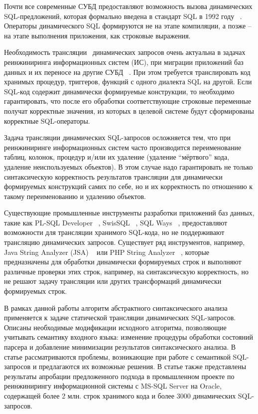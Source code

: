 \documentclass[a5paper]{article}
\begin{document}
Почти все современные СУБД предоставляют возможность вызова динамических SQL-предложений, которая формально введена в стандарт SQL в 1992 году ~\cite{ISO}. Операторы динамического SQL формируются не на этапе компиляции, а позже -- на этапе выполнения приложения, как строковые выражения.

Необходимость трансляции~\cite{mart} динамических запросов очень актуальна в задачах реинжиниринга информационных систем (ИС), при миграции приложений баз данных и их переносе на другие СУБД ~\cite{NetDbTransform}. При этом требуется транслировать код хранимых процедур, триггеров, функций с одного диалекта SQL на другой. Если SQL-код содержит  динамически формируемые конструкции, то необходимо гарантировать, что после его обработки соответствующие строковые переменные получат корректные значения, из которых в целевой системе будут сформированы корректные SQL-операторы.

Задача трансляции динамических SQL-запросов осложняется тем, что при реинжиниринге информационных систем часто производится переименование таблиц, колонок, процедур и/или их удаление (удаление “мёртвого” кода, удаление неиспользуемых объектов). В этом случае надо гарантировать не только синтаксическую корректность результатов трансляции для динамически формируемых конструкций самих по себе, но и их корректность по отношению к такому переименованию и удалению объектов.

Существующие промышленные инструменты разработки приложений баз данных, такие как PL-SQL Developer ~\cite{PLSQL}, SwisSQL ~\cite{SwissSQL}, SQL Ways ~\cite{SQLWays}, предоставляют возможности для трансляции хранимого SQL-кода, но не поддерживают трансляцию динамических запросов. Существует ряд инструментов, например, Java String Analyzer (JSA) ~\cite{JSA} или PHP String Analyzer ~\cite{PHPSA}, которые предназначены для обработки динамически формируемых строк и выполняют различные проверки этих строк, например, на синтаксическую корректность, но не решают задачу трансляции или других трансформаций динамически формируемых строк.

В рамках данной работы алгоритм абстрактного синтаксического анализа ~\cite{AbstrParsing} применяется к задаче статической трансляции динамических SQL-запросов. Описаны необходимые модификации исходного алгоритма, позволяющие учитывать семантику входного языка: изменение процедуры обработки состояний парсера и добавление минимизации результатов синтаксического анализа. В статье рассматриваются проблемы, возникающие при работе с семантикой SQL-запросов и предлагаются их возможные решения. В статье также представлены результаты апробации предложенного подхода в промышленном проекте по реинжинирингу  информационной системы с MS-SQL Server на Oracle, содержащей более 2 млн. строк хранимого кода и более 3000 динамических SQL-запросов. 
\end{document}
